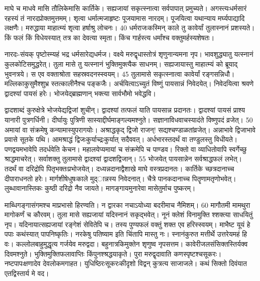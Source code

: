 माघे च माधवे मासि तौलिकेमासि कार्तिके।
 सह्यजायां सकृत्स्नात्वा सर्वपापात् प्रमुच्यते।
 अगस्त्यःधर्मसारं रहस्यं तं नारदप्रोक्तमुत्तमम्।
 शृत्वा धर्मात्मजाहृष्टः पूजयामास नारदम्।
 पूजयित्वा यथान्याय मर्घ्यपाद्यादि लक्षणैः।
 मरुद्धाया माहात्म्यं शृत्वा हर्षाश्रु लोचनः।
 40 धर्मराजःकस्मिन् काले तु कावेर्यां तुलास्नानं प्रशस्यते।
 किं फलं किं विधेयस्यात् तत्र का देवत्या स्मृता।
 किंच गार्हस्त्य धर्मांश्च वक्तुमर्हस्यशेषतः।
 
नारदः-संयक् पृष्टोस्म्यहं भद्र धर्मसारेद्यधर्मज।
 वक्ष्ये मरुद्वृधास्तोत्रं शृणुनान्यमना नृप।
 भावशुद्ध्यातु यत्स्नानं कुलकोटिसमुद्धरेत्।
 तुला मासे तु यत्स्नानं भुक्तिमुक्त्यैक साधनम्।
 सह्यजायास्तु माहात्म्यं को ब्रूयाद् भुवनत्रये।
 स एव वक्ताश्रोता सहस्रवदनस्स्वयम्।
 45 तुलामासे सकृत्स्नात्वा कावेर्यां रङ्गसन्निधौ।
 मल्लिकाकुसुमैश्शुभ्र स्तत्कालीनैश्च पङ्कजैः।
 अर्चयित्वाऽच्युतं विष्णुं पायसान्नं निवेदयेत्।
 निवेदयित्वा श्रवणे द्वादश्यां पायसं हरेः।
 भोजयेद्ब्राह्मणान् भक्त्या सार्वभौमो भवेद्धवि।
 
द्वादशाब्दं कुरुक्षेत्रे भोजयेद्यद्विजां शुचीन्।
 द्वादश्यां तत्फलं याति पायसान्न प्रदानतः।
 द्वादश्यां पायसं प्राश्य यानारी पुत्रगर्धिनी।
 दीर्घायुः पुत्रिणी सास्याद्दीर्घमाङ्गल्यमश्नुते।
 सज्ञानाविधवाचस्यादंते विष्णुपदं व्रजेत्।
 50 अमायां वा संक्रमेषु कन्यामास्युपरागयोः।
 अश्राद्धकृद् द्विजो राजन्! सद्यश्चण्डाळतांव्रजेत्।
 अन्नाभावे द्विजाभावे प्रवासे सूतके पथि।
 आमश्राद्धं द्विजःकुर्याच्द्रःकुर्यात् सदैववत्।
 अर्धभारस्तदर्थं वा तण्डुलस्तु विधीयते।
 पणद्वयमभावेपि तदर्धवेति केचन।
 महालयेप्यमायां च संक्रमेपि च पाण्डव।
 रिक्तो वा व्याधितोवापि स्वर्गेच्छु श्राद्धमाचरेत्।
 सर्वाशक्तु तुलामासे द्वादश्यां द्वादशद्विजान्।
 55 भोजयेत् पायसान्नेन सर्वश्राद्धफलं लभेत्।
 तदर्थं वा दरिद्रोपि पितृभक्तःप्रभोजयेत्।
 दध्यन्नदानाद्वैशाखे माघे वस्त्रप्रदानतः।
 कार्तिके च्छत्रदानाच्च दीपाराधनतो हरेः।
 मार्गशीषेधुषःकाले मुद्ान्नस्य निवेदनात्।
 चैत्रे पानकदानाच्च पितॄणामतृणोभवेत्।
 लुब्धावानास्तिकः कुष्ठी दरिद्रो नैव जायते।
 मागङ्गायमुनारेवा मासेतुर्माच पुष्करम्।
 
माब्धिगङ्गासंगमश्च माप्रभासो हिरण्वति।
 न द्वारका नचाऽयोध्या बदरीमाच नैमिशम्।
 60 मागौतमी मामथुरा मागोकर्णं च कौरवम्।
 तुला मासे सह्यजायां यदिस्नानं सकृद्भवेत्।
 नूनं क्लेशं विनामुक्ति श्शक्त्या साधयितुं नृप।
 यदिनायात्सह्यजायां रङ्गेशं सेवितेपि च।
 तस्य पुण्यफलं वक्तुं शक्त एव हरिस्स्वयम्।
 माभैष्ट यूयं हे पपाः कथंस्यात् पापनिष्कृतिः।
 नरकेषु पतिष्याम इति चिंतापि मास्तु नः।
 स्नानंकुरुत मत्तीर्थे उत्तरेयमहं हि वः।
 कल्लोलबाहुमुद्धृत्य गर्जयेव मरुद्वदा।
 बहुनात्रकिमुक्तेन शृणुष्व नृपसत्तम।
 कावेरीजलसंसिक्तस्तिर्यक्व दिवमश्नुते।
 भुक्तिमुक्तिफलावाप्तिः किंपुनश्श्रद्धयाकृते।
 पुरा मरुद्वृदावाति कणस्पृष्टश्चसूकरः।
 नष्टपापःक्षणादेव देवलोकमगाहत।
 युधिष्ठिरःसूकरःकीदृशो विद्वन् कुत्रत्य साजाजले।
 कथं सिक्तो दिवंयात एतद्विस्तार्य मे वद।
 
